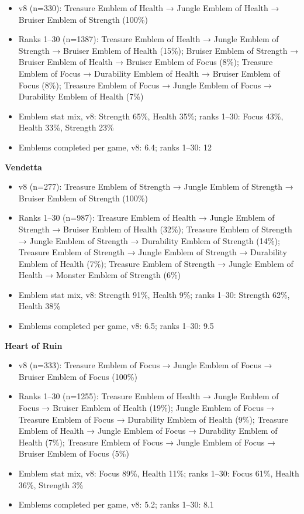 \documentclass[
  10pt,
]{article}
\providecommand{\tightlist}{%
  \setlength{\itemsep}{0pt}\setlength{\parskip}{0pt}}
\begin{document}
\begin{itemize}
\tightlist
\item
  v8 (n=330): Treasure Emblem of Health → Jungle Emblem of Health →
  Bruiser Emblem of Strength (100\%)
\item
  Ranks 1--30 (n=1387): Treasure Emblem of Health → Jungle Emblem of
  Strength → Bruiser Emblem of Health (15\%); Bruiser Emblem of Strength
  → Bruiser Emblem of Health → Bruiser Emblem of Focus (8\%); Treasure
  Emblem of Focus → Durability Emblem of Health → Bruiser Emblem of
  Focus (8\%); Treasure Emblem of Focus → Jungle Emblem of Focus →
  Durability Emblem of Health (7\%)
\item
  Emblem stat mix, v8: Strength 65\%, Health 35\%; ranks 1--30: Focus
  43\%, Health 33\%, Strength 23\%
\item
  Emblems completed per game, v8: 6.4; ranks 1--30: 12
\end{itemize}

\textbf{Vendetta}

\begin{itemize}
\tightlist
\item
  v8 (n=277): Treasure Emblem of Strength → Jungle Emblem of Strength →
  Bruiser Emblem of Strength (100\%)
\item
  Ranks 1--30 (n=987): Treasure Emblem of Health → Jungle Emblem of
  Strength → Bruiser Emblem of Health (32\%); Treasure Emblem of
  Strength → Jungle Emblem of Strength → Durability Emblem of Strength
  (14\%); Treasure Emblem of Strength → Jungle Emblem of Strength →
  Durability Emblem of Health (7\%); Treasure Emblem of Strength →
  Jungle Emblem of Health → Monster Emblem of Strength (6\%)
\item
  Emblem stat mix, v8: Strength 91\%, Health 9\%; ranks 1--30: Strength
  62\%, Health 38\%
\item
  Emblems completed per game, v8: 6.5; ranks 1--30: 9.5
\end{itemize}

\textbf{Heart of Ruin}

\begin{itemize}
\tightlist
\item
  v8 (n=333): Treasure Emblem of Focus → Jungle Emblem of Focus →
  Bruiser Emblem of Focus (100\%)
\item
  Ranks 1--30 (n=1255): Treasure Emblem of Health → Jungle Emblem of
  Focus → Bruiser Emblem of Health (19\%); Jungle Emblem of Focus →
  Treasure Emblem of Focus → Durability Emblem of Health (9\%); Treasure
  Emblem of Health → Jungle Emblem of Focus → Durability Emblem of
  Health (7\%); Treasure Emblem of Focus → Jungle Emblem of Focus →
  Bruiser Emblem of Focus (5\%)
\item
  Emblem stat mix, v8: Focus 89\%, Health 11\%; ranks 1--30: Focus 61\%,
  Health 36\%, Strength 3\%
\item
  Emblems completed per game, v8: 5.2; ranks 1--30: 8.1
\end{itemize}
\end{document}
